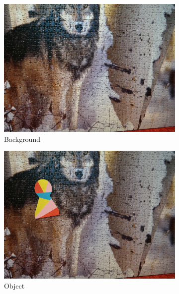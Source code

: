 \begin{figure}
  \centering
  \begin{subfigure}[b]{0.48\linewidth}
    \includegraphics[width=\linewidth]{img/simple_background/background.jpg}
    \caption{Background}
  \end{subfigure}
  \begin{subfigure}[b]{0.48\linewidth}
    \includegraphics[width=\linewidth]{img/simple_background/object.jpg}
    \caption{Object}
  \end{subfigure}
  \begin{subfigure}[b]{0.48\linewidth}

\end{subfigure}
\end{figure}
